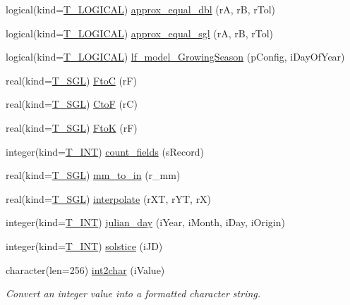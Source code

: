 \begin{DoxyCompactItemize}
logical(kind=\hyperlink{namespacetypes_adfa8f4f6096bb7bdbb93f36b911dcaad}{T\_\-LOGICAL}) \hyperlink{namespacetypes_a3209cf8641ab770d9f6929cd303442a6}{approx\_\-equal\_\-dbl} (rA, rB, rTol)
\item 
logical(kind=\hyperlink{namespacetypes_adfa8f4f6096bb7bdbb93f36b911dcaad}{T\_\-LOGICAL}) \hyperlink{namespacetypes_a60490ed5b6b7d5903a034d5e531538db}{approx\_\-equal\_\-sgl} (rA, rB, rTol)
\item 
logical(kind=\hyperlink{namespacetypes_adfa8f4f6096bb7bdbb93f36b911dcaad}{T\_\-LOGICAL}) \hyperlink{namespacetypes_ae89a23df854f9f89cad1ced3667b267a}{lf\_\-model\_\-GrowingSeason} (pConfig, iDayOfYear)
\item 
real(kind=\hyperlink{namespacetypes_af3012489af4c138f271f1bce244b7e51}{T\_\-SGL}) \hyperlink{namespacetypes_a1ac08c4c46c18fd254270b91881836cd}{FtoC} (rF)
\item 
real(kind=\hyperlink{namespacetypes_af3012489af4c138f271f1bce244b7e51}{T\_\-SGL}) \hyperlink{namespacetypes_adc61e2bd06f7763a41664635cd792fa8}{CtoF} (rC)
\item 
real(kind=\hyperlink{namespacetypes_af3012489af4c138f271f1bce244b7e51}{T\_\-SGL}) \hyperlink{namespacetypes_a6d9d8e8b7f4594406e117e925a28ed71}{FtoK} (rF)
\item 
integer(kind=\hyperlink{namespacetypes_a4e4d040a4425196c4d43be63e7e6103a}{T\_\-INT}) \hyperlink{namespacetypes_afb2b5df966d0995a0ef41180e05a0dc1}{count\_\-fields} (sRecord)
\item 
real(kind=\hyperlink{namespacetypes_af3012489af4c138f271f1bce244b7e51}{T\_\-SGL}) \hyperlink{namespacetypes_a6656bdb69c63e89fc6a5a56171dab67b}{mm\_\-to\_\-in} (r\_\-mm)
\item 
real(kind=\hyperlink{namespacetypes_af3012489af4c138f271f1bce244b7e51}{T\_\-SGL}) \hyperlink{namespacetypes_a7099d6b490c7a33120d4d9976142f72c}{interpolate} (rXT, rYT, rX)
\item 
integer(kind=\hyperlink{namespacetypes_a4e4d040a4425196c4d43be63e7e6103a}{T\_\-INT}) \hyperlink{namespacetypes_a5f9e09099f47bada40db4475ee5778ae}{julian\_\-day} (iYear, iMonth, iDay, iOrigin)
\item 
integer(kind=\hyperlink{namespacetypes_a4e4d040a4425196c4d43be63e7e6103a}{T\_\-INT}) \hyperlink{namespacetypes_a9b6e5619a6384f5bf6c383f273414f55}{solstice} (iJD)
\item 
character(len=256) \hyperlink{namespacetypes_ac81e1d5f7a39f96a2b492f098c2ba2e7}{int2char} (iValue)
\begin{DoxyCompactList}\small\item\em Convert an integer value into a formatted character string. \item\end{DoxyCompactList}\item 

\end{DoxyCompactItemize}
